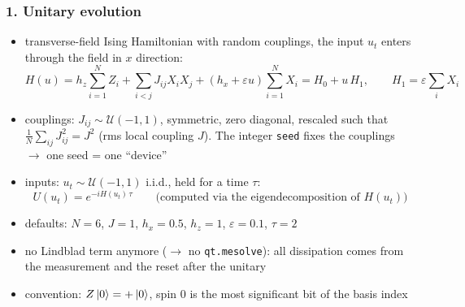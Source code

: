 \subsubsection*{1. Unitary evolution}
\begin{itemize}
    \item transverse-field Ising Hamiltonian with random couplings, the input $u_t$ enters through the
    field in $x$ direction:
    \begin{equation*}
        H(u) = h_z \sum_{i=1}^{N} Z_i + \sum_{i<j} J_{ij} X_i X_j + (h_x + \varepsilon u) \sum_{i=1}^{N} X_i
        = H_0 + u\, H_1, \qquad H_1 = \varepsilon \sum_i X_i
    \end{equation*}
    \item couplings: $J_{ij} \sim \mathcal{U}(-1, 1)$, symmetric, zero diagonal, rescaled such that
    $\frac{1}{N}\sum_{ij} J_{ij}^2 = J^2$ (rms local coupling $J$). The integer \texttt{seed} fixes the
    couplings $\to$ one seed = one ``device''
    \item inputs: $u_t \sim \mathcal{U}(-1, 1)$ i.i.d., held for a time $\tau$:
    \begin{equation*}
        U(u_t) = e^{-i H(u_t)\,\tau} \qquad \text{(computed via the eigendecomposition of } H(u_t)\text{)}
    \end{equation*}
    \item defaults: $N = 6$, $J = 1$, $h_x = 0.5$, $h_z = 1$, $\varepsilon = 0.1$, $\tau = 2$
    \item no Lindblad term anymore ($\to$ no \texttt{qt.mesolve}): all dissipation comes from the
    measurement and the reset after the unitary
    \item convention: $Z\ket{0} = +\ket{0}$, spin 0 is the most significant bit of the basis index
\end{itemize}

